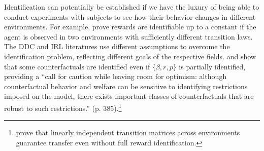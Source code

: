Identification can potentially be established if we have the luxury of being
able to conduct experiments with subjects to see how their behavior changes in different environments.
For example, \citet{cao_irl:2021} prove rewards are identifiable up to a constant if the agent is observed in two environments with sufficiently different transition laws.
The DDC and IRL literatures use different assumptions to overcome  the identification problem,
reflecting different goals of the respective fields. \citet{eerl:2026} and \citet{souza:2021} 
show that some counterfactuals are identified even if $\{\beta,r,p\}$ 
is partially identified, providing a  ``call for caution while leaving room for optimism: 
although counterfactual behavior and welfare can be sensitive to identifying restrictions imposed on the model, 
there exists important classes of counterfactuals that are robust to such restrictions.'' (p. 385).\footnote{\footnotesize \citet{rolland:2022} prove that linearly independent transition matrices across environments guarantee transfer even without full reward identification.}





